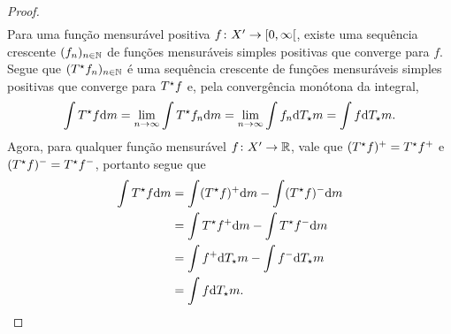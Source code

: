 \begin{proof}
\begin{align*}
	\end{align*}
Para uma função mensurável positiva $f\colon X' \to \left[{0},{\infty}\right[$, existe uma sequência crescente $(f_n)_{n \in \mathbb{N}}$ de funções mensuráveis simples positivas que converge para $f$. Segue que $(T^\star f_n)_{n \in \mathbb{N}}$ é uma sequência crescente de funções mensuráveis simples positivas que converge para $T^\star f$ e, pela convergência monótona da integral,
	\begin{equation*}
	\int T^\star f \mathrm{d}m = \lim_{n \rightarrow \infty} \int T^\star f_n \mathrm{d} m  = \lim_{n \rightarrow \infty} \int f_n \mathrm{d} T_\star m = \int f \mathrm{d} T_\star m.
	\end{equation*}
Agora, para qualquer função mensurável $f\colon X' \to \mathbb{R}$, vale que $(T^\star f)^+ = T^\star f^+$ e $(T^\star f)^- = T^\star f^-$, portanto segue que
	\begin{align*}
	\int T^\star f \mathrm{d}m &= \int (T^\star f)^+ \mathrm{d}m - \int (T^\star f)^- \mathrm{d}m \\
		&= \int T^\star f^+ \mathrm{d}m - \int T^\star f^- \mathrm{d}m \\
		&= \int f^+ \mathrm{d} T_\star m - \int f^- \mathrm{d} T_\star m \\
		&= \int f \mathrm{d} T_\star m.
	\end{align*}
\end{proof}

